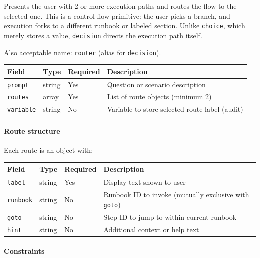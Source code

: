 Presents the user with 2 or more execution paths and routes the flow to the
selected one.  This is a control-flow primitive: the user picks a branch, and
execution forks to a different runbook or labeled section.  Unlike
\texttt{choice}, which merely stores a value, \texttt{decision} directs the
execution path itself.

Also acceptable name: \texttt{router} (alias for \texttt{decision}).

\begin{center}
\begin{tabular}{lllp{5cm}}
\hline
\textbf{Field} & \textbf{Type} & \textbf{Required} & \textbf{Description} \\
\hline
\texttt{prompt}   & string  & Yes & Question or scenario description \\
\texttt{routes}   & array   & Yes & List of route objects (minimum 2) \\
\texttt{variable} & string  & No  & Variable to store selected route label (audit) \\
\hline
\end{tabular}
\end{center}

\paragraph{Route structure}

Each route is an object with:

\begin{center}
\begin{tabular}{lllp{5cm}}
\hline
\textbf{Field} & \textbf{Type} & \textbf{Required} & \textbf{Description} \\
\hline
\texttt{label}   & string & Yes & Display text shown to user \\
\texttt{runbook} & string & No  & Runbook ID to invoke (mutually exclusive with \texttt{goto}) \\
\texttt{goto}    & string & No  & Step ID to jump to within current runbook \\
\texttt{hint}    & string & No  & Additional context or help text \\
\hline
\end{tabular}
\end{center}

\paragraph{Constraints}

